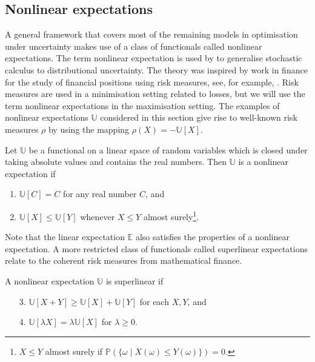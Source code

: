 \documentclass[main.tex]{subfiles}
\begin{document}
\subsection{Nonlinear expectations}\label{sec:nonlinear_expectations}
A general framework that covers most of the remaining models
in optimisation under uncertainty makes use of a class of functionals
called nonlinear expectations. The term nonlinear expectation is used
by \citet{peng2010nonlinear} to generalise stochastic calculus to
distributional uncertainty.
The theory was inspired by work in finance for the study of financial
positions using
risk measures, see,
for example, \citet[Ch.~4]{follmer2004stochastic}.
Risk measures are used in a minimisation setting related to losses,
but we will use the term nonlinear expectations in the maximisation
setting. The examples of nonlinear expectations $\mathbb{U}$ considered
in this section give rise to well-known risk measures $\rho$ by using the mapping
$\rho(X) = -\mathbb{U}[X]$.

\begin{mydef}
  Let $\mathbb{U}$ be a functional on a linear space of random
  variables which is closed under taking absolute values and contains
  the real numbers.
  Then $\mathbb{U}$ is a nonlinear expectation if
  \begin{enumerate}
  \item $\mathbb{U}[C] = C$ for any real number $C$, and
  \item $\mathbb{U}[X]\leq \mathbb{U}[Y]$ whenever $X\leq Y$ almost
    surely\footnote{$X\leq Y$ almost surely if $\mathbb{P}(\{\omega\mid X(\omega)\leq Y(\omega)\})=0$.}.
  \end{enumerate}
\end{mydef}
Note that the linear expectation $\mathbb{E}$ also satisfies
the properties of a nonlinear expectation.
A more restricted class of functionals called superlinear expectations
relate to the coherent risk measures from mathematical finance.
\begin{mydef}
  A nonlinear expectation $\mathbb{U}$ is superlinear if
  \begin{enumerate}
  \item[3.] $\mathbb{U}[X+Y]\geq \mathbb{U}[X] +\mathbb{U}[Y]$ for
    each $X,Y$, and
  \item[4.] $\mathbb{U}[\lambda X] = \lambda\mathbb{U}[X]$ for
    $\lambda\geq 0$.
  \end{enumerate}
\end{mydef}
\end{document}
